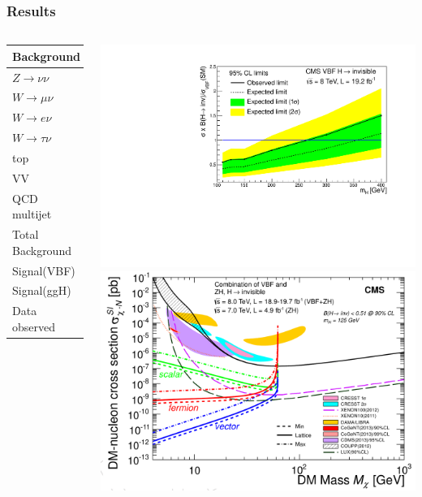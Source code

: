 \documentclass[red,compress,xcolor=table]{beamer}
\begin{document}
\begin{frame}
\frametitle{Results}

\begin{columns}
{\tiny
  \begin{tabular}{|l|c|}
    \hline
    Background       & $N_{est} \pm (stat) \pm (syst)$ \\
    \hline
    $Z\rightarrow\nu\nu$&$157.3 \pm 37.6 \pm 38.3$\\
    $W\rightarrow\mu\nu$&$101.8 \pm 6.1 \pm 11.9$\\
    $W\rightarrow e\nu$&$57.4 \pm 7.3 \pm 7.0$\\
    $W\rightarrow\tau\nu$&$98.0 \pm 13.2 \pm 25.4$\\
    top&$4.4 \pm 1.0 \pm 1.4$\\
    VV&$3.8 \pm 0.0 \pm 0.7$\\
    QCD multijet &$17\pm 0 \pm14$\\
    \hline
    Total Background &$439.7 \pm 41.0 \pm 55.8 $\\
    \hline
    Signal(VBF) &$273.4 \pm 0.0 \pm 31.2 $\\
    Signal(ggH) &$22.6 \pm 0.0 \pm 15.6 $\\
    \hline
    Data observed & 508 \\
    \hline
  \end{tabular}
}  \includegraphics[width=1.0\textwidth]{./vbflimit.pdf}
  \includegraphics[width=1.0\textwidth]{./DMlimits.png}

\end{columns}
\end{frame}
\end{document}
